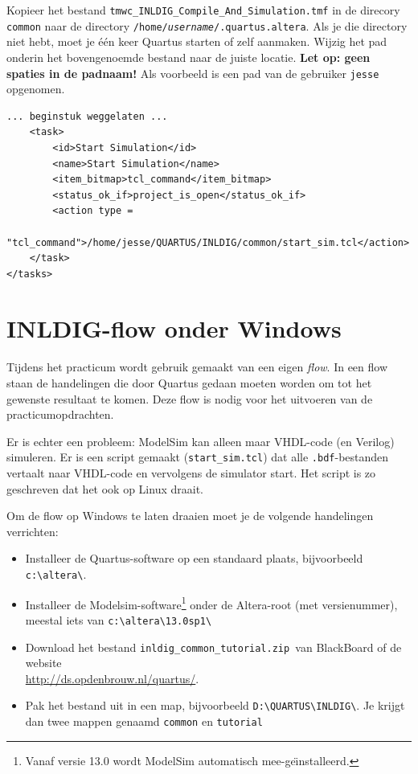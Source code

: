 \documentclass[a4paper,12pt,fleqn,twoside]{book}
\newcommand{\naam}[1]{\texttt{#1}}
\begin{document}
Kopieer het bestand \lstinline|tmwc_INLDIG_Compile_And_Simulation.tmf| in de
direcory \naam{common} naar de directory
\naam{/home/\textsl{username}/.quartus.altera}.
Als je die directory niet hebt, moet je \'{e}\'{e}n keer Quartus starten of
zelf aanmaken. Wijzig het pad onderin het bovengenoemde bestand naar de
juiste locatie. \textbf{Let op: geen spaties in de padnaam!} Als
voorbeeld is een pad van de gebruiker \naam{jesse} opgenomen. 

\bigskip
\begin{lstlisting}[numbers=none]
... beginstuk weggelaten ...
    <task> 
        <id>Start Simulation</id> 
        <name>Start Simulation</name> 
        <item_bitmap>tcl_command</item_bitmap> 
        <status_ok_if>project_is_open</status_ok_if> 
        <action type =
            "tcl_command">/home/jesse/QUARTUS/INLDIG/common/start_sim.tcl</action> 
    </task> 
</tasks> 
\end{lstlisting}



\chapter{INLDIG-flow onder Windows}
\label{chap:inldigflowonderwindows}
Tijdens het practicum wordt gebruik gemaakt van een eigen \textsl{flow}.
In een flow staan de handelingen die door Quartus gedaan moeten worden om
tot het gewenste resultaat te komen. Deze flow is nodig voor het uitvoeren
van de practicumopdrachten. 

Er is echter een probleem: ModelSim kan alleen maar VHDL-code (en Verilog)
simuleren. Er is een script gemaakt (\lstinline|start_sim.tcl|) dat alle
\naam{.bdf}-bestanden vertaalt naar VHDL-code en vervolgens de simulator
start. Het script is zo geschreven dat het ook op Linux draait.
 
Om de flow op Windows te laten draaien moet je de volgende handelingen
verrichten:

\begin{itemize}\itemsep-1pt
\item Installeer de Quartus-software op een standaard plaats, bijvoorbeeld
      \lstinline|c:\altera\|.
\item Installeer de Modelsim-software\footnote{Vanaf versie 13.0 wordt
      ModelSim automatisch mee-ge\"{\i}nstalleerd.} onder de Altera-root
      (met versienummer), meestal iets van \lstinline|c:\altera\13.0sp1\| 
\item Download het bestand \lstinline|inldig_common_tutorial.zip |van
      BlackBoard of de website\\ \url{http://ds.opdenbrouw.nl/quartus/}. 
\item Pak het bestand uit in een map, bijvoorbeeld
      \lstinline|D:\QUARTUS\INLDIG\|. Je krijgt dan twee mappen genaamd
      \lstinline|common| en \lstinline|tutorial|
\end{itemize}
      
\end{document}
